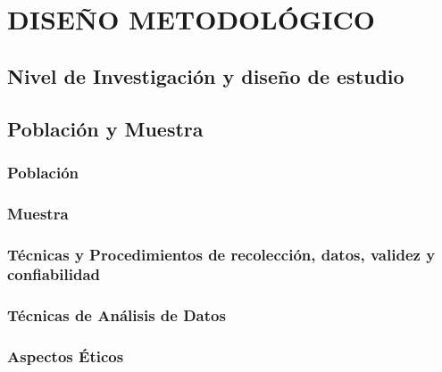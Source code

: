 \chapter{DISEÑO METODOLÓGICO} \label{cap:diseño}
	\section{Nivel de Investigación y diseño de estudio} \label{sec:nivel}
	\section{Población y Muestra} \label{sec:poblacion}
		\subsection{Población} \label{ssec:poblacion}
		\subsection{Muestra} \label{ssec:muestra}
		\subsection{Técnicas y Procedimientos de recolección, datos, validez y confiabilidad} \label{ssec:tecyproc}
		\subsection{Técnicas de Análisis de Datos} \label{ssec:tecnicas}
		\subsection{Aspectos Éticos} \label{ssec:etica}